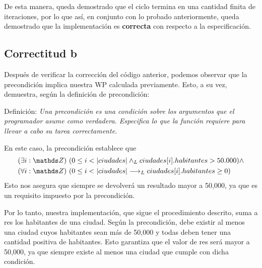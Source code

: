 \documentclass[10pt,a4paper]{article}
\begin{document}
De esta manera, queda demostrado que el ciclo termina en una cantidad finita de iteraciones, por lo que así, en conjunto con lo probado anteriormente, queda demostrado que la implementación es \textbf{correcta} con respecto a la especificación.

\subsection{Correctitud b}
Después de verificar la corrección del código anterior, podemos observar que la precondición implica nuestra WP calculada previamente. Esto, a su vez, demuestra, según la definición de precondición:
\medskip

Definición: \textit{Una precondición es una condición sobre los argumentos que el programador asume como verdadera. Especifica lo que la función requiere para llevar a cabo su tarea correctamente.}
\medskip

En este caso, la precondición establece que
\begin{align*}
	 & \existe[unalinea]{i}{\ent}{0 \leq i < |ciudades| \yLuego ciudades[i].habitantes > 50.000} \land \\
	 & \paraTodo[unalinea]{i}{\ent}{0 \leq i < |ciudades| \implicaLuego ciudades[i].habitantes \geq 0}
\end{align*}
Esto nos asegura que siempre se devolverá un resultado mayor a 50,000, ya que es un requisito impuesto por la precondición.
\medskip

Por lo tanto, nuestra implementación, que sigue el procedimiento descrito, suma a res los habitantes de una ciudad. Según la precondición, debe existir al menos una ciudad cuyos habitantes sean más de 50,000 y todas deben tener una cantidad positiva de habitantes. Esto garantiza que el valor de res será mayor a 50,000, ya que siempre existe al menos una ciudad que cumple con dicha condición.
\end{document}
